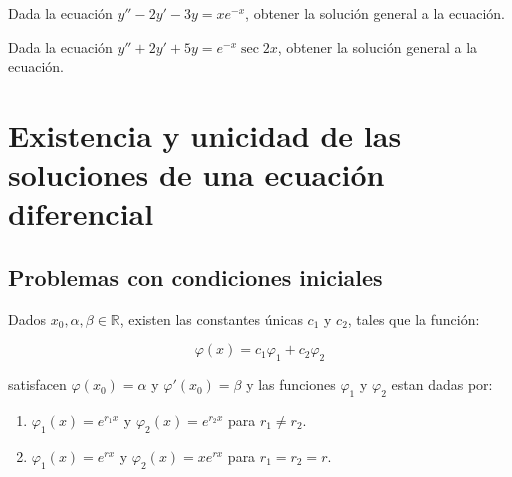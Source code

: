 		\begin{ejercicio}
			Dada la ecuación $y'' - 2 y' - 3 y = x e^{-x}$, obtener la solución general a la ecuación.
		\end{ejercicio}

		\begin{ejercicio}
			Dada la ecuación $y'' + 2 y' + 5 y = e^{-x} \sec{2x}$, obtener la solución general a la ecuación.
		\end{ejercicio}

\newpage
\section{Existencia y unicidad de las soluciones de una ecuación diferencial}

	\subsection{Problemas con condiciones iniciales}

		\begin{teorema}
			Dados $x_0, \alpha, \beta \in \mathbb{R}$, existen las constantes únicas $c_1$ y $c_2$, tales que la función:

			\begin{equation}
				\varphi(x) = c_1 \varphi_1 + c_2 \varphi_2
			\end{equation}

			satisfacen $\varphi(x_0) = \alpha$ y $\varphi'(x_0) = \beta$ y las funciones $\varphi_1$ y $\varphi_2$ estan dadas por:

			\begin{enumerate}
				\item $\varphi_1(x) = e^{r_1 x}$ y $\varphi_2(x) = e^{r_2 x}$ para $r_1 \ne r_2$.
				\item $\varphi_1(x) = e^{rx}$ y $\varphi_2(x) = x e^{rx}$ para $r_1 = r_2 = r$.
			\end{enumerate}
		\end{teorema}

